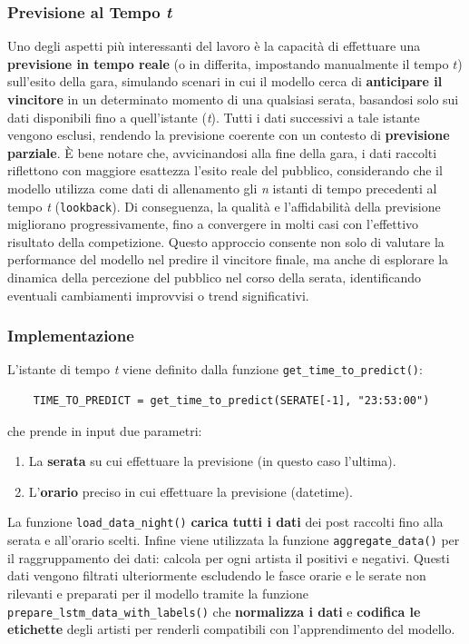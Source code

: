 \documentclass[a4paper,12pt]{article}
\begin{document}
\subsubsection{Previsione al Tempo \textit{t}}
Uno degli aspetti più interessanti del lavoro è la capacità di effettuare una \textbf{previsione in tempo reale} (o in differita, impostando manualmente il tempo \(t\)) sull'esito della gara, simulando scenari in cui il modello cerca di \textbf{anticipare il vincitore} in un determinato momento di una qualsiasi serata, basandosi solo sui dati disponibili fino a quell'istante (\textit{t}). Tutti i dati successivi a tale istante vengono esclusi, rendendo la previsione coerente con un contesto di \textbf{previsione parziale}. È bene notare che, avvicinandosi alla fine della gara, i dati raccolti riflettono con maggiore esattezza l'esito reale del pubblico, considerando che il modello utilizza come dati di allenamento gli \textit{n} istanti di tempo precedenti al tempo \textit{t} (\texttt{lookback}). Di conseguenza, la qualità e l'affidabilità della previsione migliorano progressivamente, fino a convergere in molti casi con l'effettivo risultato della competizione. Questo approccio consente non solo di valutare la performance del modello nel predire il vincitore finale, ma anche di esplorare la dinamica della percezione del pubblico nel corso della serata, identificando eventuali cambiamenti improvvisi o trend significativi.

\subsubsection{Implementazione}
L'istante di tempo \textit{t} viene definito dalla funzione \texttt{get\_time\_to\_predict()}:
\begin{verbatim}
    TIME_TO_PREDICT = get_time_to_predict(SERATE[-1], "23:53:00")
\end{verbatim}
che prende in input due parametri:
\begin{enumerate}
    \item La \textbf{serata} su cui effettuare la previsione (in questo caso l'ultima).
    \item L'\textbf{orario} preciso in cui effettuare la previsione (datetime).    
\end{enumerate}
La funzione \texttt{load\_data\_night()} \textbf{carica tutti i dati} dei post raccolti fino alla serata e all'orario scelti. Infine viene utilizzata la funzione \texttt{aggregate\_data()} per il raggruppamento dei dati: calcola per ogni artista il positivi e negativi. Questi dati vengono filtrati ulteriormente escludendo le fasce orarie e le serate non rilevanti e preparati per il modello tramite la funzione \texttt{prepare\_lstm\_data\_with\_labels()} che \textbf{normalizza i dati} e \textbf{codifica le etichette} degli artisti per renderli compatibili con l'apprendimento del modello. 
\end{document}
